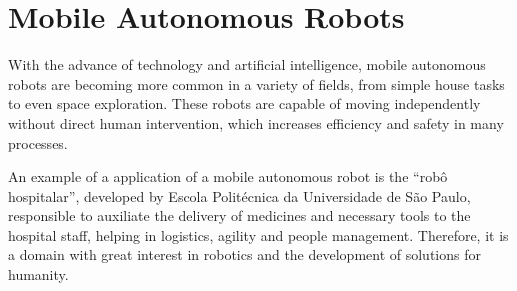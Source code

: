 \documentclass[../../monografia.tex]{subfiles}
\begin{document}
\section{Mobile Autonomous Robots}

With the advance of technology and artificial intelligence, mobile autonomous robots are becoming more common in a variety of fields, from simple house tasks to even space exploration. These robots are capable of moving independently without direct human intervention, which increases efficiency and safety in many processes.

An example of a application of a mobile autonomous robot is the “robô hospitalar”, developed by Escola Politécnica da Universidade de São Paulo, responsible to auxiliate the delivery of medicines and necessary tools to the hospital staff, helping in logistics, agility and people management. Therefore, it is a domain with great interest in robotics and the development of solutions for humanity.
\end{document}
